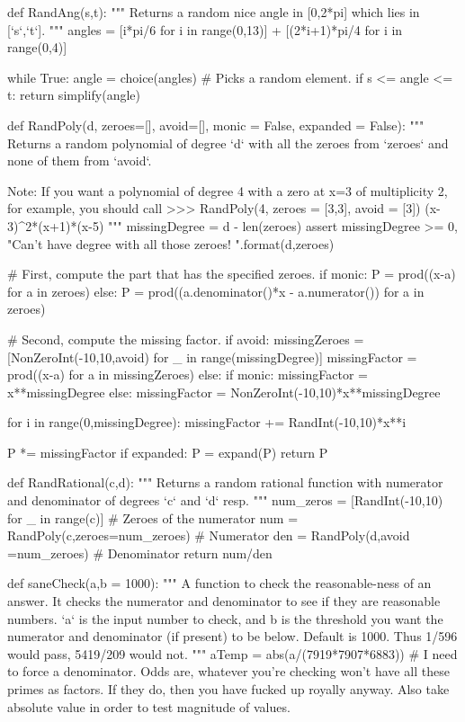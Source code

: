 \begin{sagesilent}
def RandAng(s,t):
    """ Returns a random nice angle in [0,2*pi] which lies in [`s`,`t`].
    """
    angles = [i*pi/6 for i in range(0,13)] + [(2*i+1)*pi/4 for i in range(0,4)]

    while True:
        angle = choice(angles) # Picks a random element.
        if s <= angle <= t:
            return simplify(angle)

def RandPoly(d, zeroes=[], avoid=[], monic = False, expanded = False):
    """ Returns a random polynomial of degree `d` with all the zeroes from
        `zeroes` and none of them from `avoid`.

        Note: If you want a polynomial of degree 4 with a zero at x=3 of
        multiplicity 2, for example, you should call
        >>> RandPoly(4, zeroes = [3,3], avoid = [3])
        (x-3)^2*(x+1)*(x-5)
    """
    missingDegree = d - len(zeroes)
    assert missingDegree >= 0, "Can't have degree {} with all those zeroes! {}".format(d,zeroes)

    # First, compute the part that has the specified zeroes.
    if monic:
        P = prod((x-a) for a in zeroes)
    else:
        P = prod((a.denominator()*x - a.numerator()) for a in zeroes)

    # Second, compute the missing factor.
    if avoid:
        missingZeroes =[NonZeroInt(-10,10,avoid) for _ in range(missingDegree)]
        missingFactor = prod((x-a) for a in missingZeroes)
    else:
        if monic:
            missingFactor = x**missingDegree
        else:
            missingFactor = NonZeroInt(-10,10)*x**missingDegree

        for i in range(0,missingDegree):
            missingFactor += RandInt(-10,10)*x**i
        
    P *= missingFactor
    if expanded:
        P = expand(P)
    return P

def RandRational(c,d):
    """ Returns a random rational function with numerator and denominator of degrees `c` and `d` resp.
    """
    num_zeros = [RandInt(-10,10) for _ in range(c)] # Zeroes of the numerator
    num = RandPoly(c,zeroes=num_zeroes) # Numerator
    den = RandPoly(d,avoid =num_zeroes) # Denominator
    return num/den

def saneCheck(a,b = 1000):
    """ A function to check the reasonable-ness of an answer. It checks the 
        numerator and denominator to see if they are reasonable numbers. `a` is 
        the input number to check, and b is the threshold you want the numerator
        and denominator (if present) to be below. Default is 1000. Thus 1/596
        would pass, 5419/209 would not.
    """
    aTemp = abs(a/(7919*7907*6883)) # I need to force a denominator. Odds are, whatever you're checking won't have all these primes as factors. If they do, then you have fucked up royally anyway. Also take absolute value in order to test magnitude of values.
    

\end{sagesilent}
